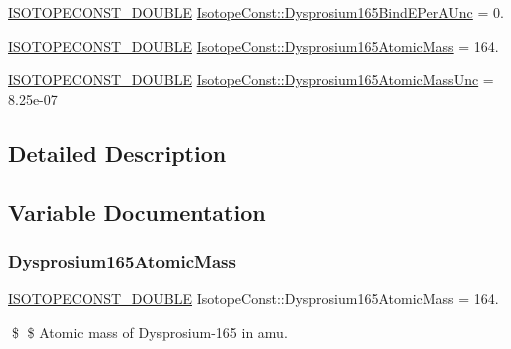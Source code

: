 \begin{DoxyCompactItemize}
\item 
\mbox{\hyperlink{group___isotope_const-_macros_ga8f45a7272ce02c0b4c65c44636ed719a}{I\+S\+O\+T\+O\+P\+E\+C\+O\+N\+S\+T\+\_\+\+D\+O\+U\+B\+LE}} \mbox{\hyperlink{group___isotope_const-_dysprosium-_dy165_ga3b20c3411048d0c933ecef3c04d6484a}{Isotope\+Const\+::\+Dysprosium165\+Bind\+E\+Per\+A\+Unc}} = 0.
\item 
\mbox{\hyperlink{group___isotope_const-_macros_ga8f45a7272ce02c0b4c65c44636ed719a}{I\+S\+O\+T\+O\+P\+E\+C\+O\+N\+S\+T\+\_\+\+D\+O\+U\+B\+LE}} \mbox{\hyperlink{group___isotope_const-_dysprosium-_dy165_ga4347e292625558fee6c32e8e0e05ca99}{Isotope\+Const\+::\+Dysprosium165\+Atomic\+Mass}} = 164.
\item 
\mbox{\hyperlink{group___isotope_const-_macros_ga8f45a7272ce02c0b4c65c44636ed719a}{I\+S\+O\+T\+O\+P\+E\+C\+O\+N\+S\+T\+\_\+\+D\+O\+U\+B\+LE}} \mbox{\hyperlink{group___isotope_const-_dysprosium-_dy165_ga412011305c126b0963e8c1ce25ac20d7}{Isotope\+Const\+::\+Dysprosium165\+Atomic\+Mass\+Unc}} = 8.\+25e-\/07
\end{DoxyCompactItemize}


\subsection{Detailed Description}


\subsection{Variable Documentation}
\mbox{\label{group___isotope_const-_dysprosium-_dy165_ga4347e292625558fee6c32e8e0e05ca99}} 
\subsubsection{\texorpdfstring{Dysprosium165\+Atomic\+Mass}{Dysprosium165AtomicMass}}
{\footnotesize\ttfamily \mbox{\hyperlink{group___isotope_const-_macros_ga8f45a7272ce02c0b4c65c44636ed719a}{I\+S\+O\+T\+O\+P\+E\+C\+O\+N\+S\+T\+\_\+\+D\+O\+U\+B\+LE}} Isotope\+Const\+::\+Dysprosium165\+Atomic\+Mass = 164.}

\$ \$ Atomic mass of Dysprosium-\/165 in amu. \mbox{\label{group___isotope_const-_dysprosium-_dy165_ga412011305c126b0963e8c1ce25ac20d7}} 
